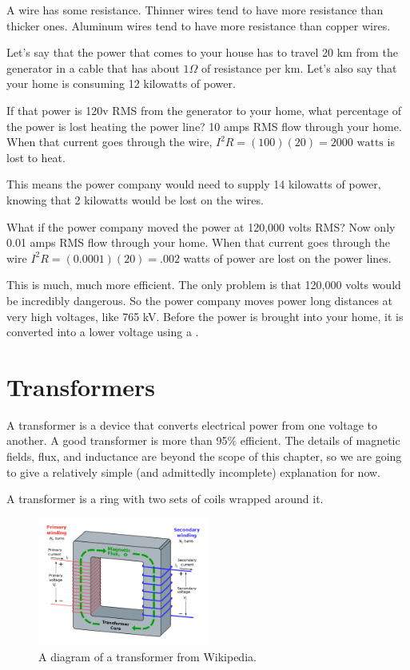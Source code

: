 A wire has some resistance. Thinner wires tend to have more resistance
than thicker ones. Aluminum wires tend to have more resistance than
copper wires.

Let's say that the power that comes to your house has to travel 20 km
from the generator in a cable that has about $1 \Omega$ of resistance
per km.  Let's also say that your home is consuming 12 kilowatts of power.

If that power is 120v RMS from the generator to your home, what
percentage of the power is lost heating the power line? 10 amps RMS
flow through your home. When that current goes through the wire, $I^2
R = (100)(20) = 2000 \text{ watts}$ is lost to heat.

This means the power company would need to supply 14 kilowatts of power,
knowing that 2 kilowatts would be lost on the wires.

What if the power company moved the power at 120,000 volts RMS? Now
only 0.01 amps RMS flow through your home. When that current goes
through the wire $I^2R = (0.0001)(20) = .002$ watts of power are lost
on the power lines.

This is much, much more efficient. The only problem is that 120,000 volts
would be incredibly dangerous.  So the power company moves power long
distances at very high voltages, like 765 kV.  Before the power is
brought into your home, it is converted into a lower voltage using a
.
\section{Transformers}

A transformer is a device that converts electrical power from one
voltage to another. A good transformer is more than 95\% efficient. The
details of magnetic fields, flux, and inductance are beyond the scope
of this chapter, so we are going to give a relatively simple (and admittedly incomplete) explanation for now.

A transformer is a ring with two sets of coils wrapped around it.
\begin{figure}[htbp]
    \centering
    \includegraphics[width=0.5\textwidth]{transformer.png}
    \caption{A diagram of a transformer from Wikipedia.}
    \label{fig:transformer}
\end{figure}

